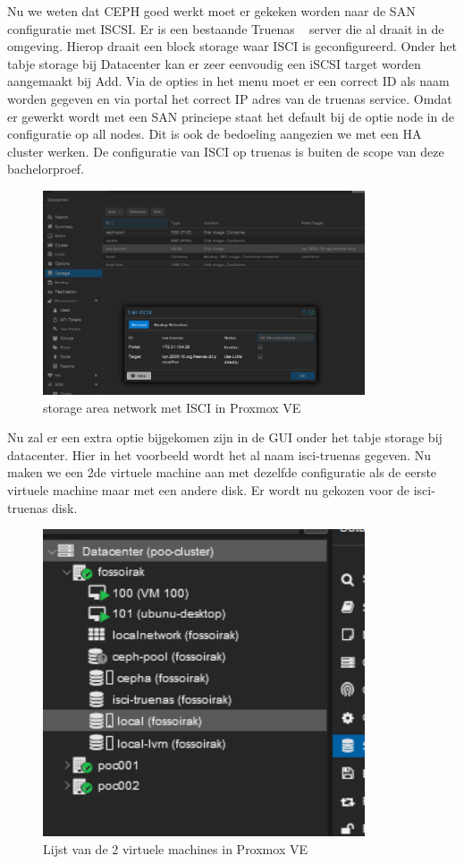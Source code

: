 Nu we weten dat CEPH goed werkt moet er gekeken worden naar de SAN configuratie met ISCSI.
Er is een bestaande Truenas ~\autocite{truenas} server die al draait in de omgeving. Hierop draait een block storage waar ISCI is geconfigureerd.
Onder het tabje storage  bij Datacenter kan er zeer eenvoudig een iSCSI target worden aangemaakt bij Add.
Via de opties in het menu moet er een correct ID als naam worden gegeven en via portal het correct IP adres van de truenas service.
Omdat er gewerkt wordt met een SAN princiepe staat het default bij de optie node in de configuratie op all nodes. Dit is ook de bedoeling aangezien we met een HA cluster werken.
De configuratie van ISCI op truenas is buiten de scope van deze bachelorproef.
\begin{figure}[H]
  \centering
  \includegraphics[width=0.85\textwidth]{../poc/iscsi-prox.png}
  \caption{storage area network met ISCI in Proxmox VE}
  \label{fig:iscsi-SAN}
\end{figure}
Nu zal er een extra  optie bijgekomen zijn in de GUI onder het tabje storage bij datacenter. Hier in het voorbeeld wordt het al naam isci-truenas gegeven.
Nu maken we een 2de virtuele machine aan met dezelfde configuratie als de eerste virtuele machine maar met een andere disk. Er wordt nu gekozen voor de isci-truenas disk.
\begin{figure}[H]
  \centering
  \includegraphics[width=0.85\textwidth]{../poc/vm-lijst-prox.png}
  \caption{Lijst van de 2 virtuele machines in Proxmox VE}
  \label{fig:vm-lijst}
\end{figure}
